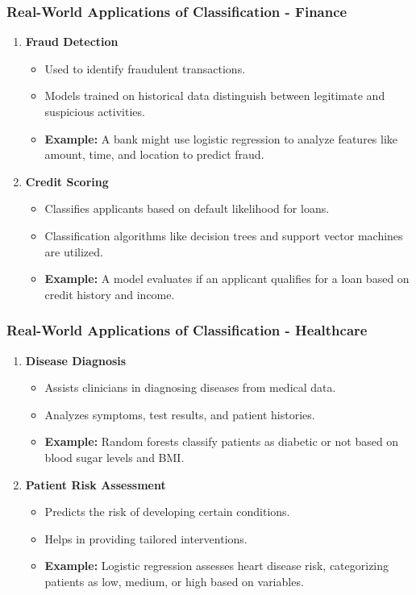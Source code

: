 \documentclass[aspectratio=169]{beamer}
\begin{document}
\begin{frame}[fragile]
    \frametitle{Real-World Applications of Classification - Finance}
    \begin{enumerate}
        \item \textbf{Fraud Detection}
            \begin{itemize}
                \item Used to identify fraudulent transactions.
                \item Models trained on historical data distinguish between legitimate and suspicious activities.
                \item \textbf{Example:} A bank might use logistic regression to analyze features like amount, time, and location to predict fraud.
            \end{itemize}
            
        \item \textbf{Credit Scoring}
            \begin{itemize}
                \item Classifies applicants based on default likelihood for loans.
                \item Classification algorithms like decision trees and support vector machines are utilized.
                \item \textbf{Example:} A model evaluates if an applicant qualifies for a loan based on credit history and income.
            \end{itemize}
    \end{enumerate}
\end{frame}

\begin{frame}[fragile]
    \frametitle{Real-World Applications of Classification - Healthcare}
    \begin{enumerate}
        \item \textbf{Disease Diagnosis}
            \begin{itemize}
                \item Assists clinicians in diagnosing diseases from medical data.
                \item Analyzes symptoms, test results, and patient histories.
                \item \textbf{Example:} Random forests classify patients as diabetic or not based on blood sugar levels and BMI.
            \end{itemize}

        \item \textbf{Patient Risk Assessment}
            \begin{itemize}
                \item Predicts the risk of developing certain conditions.
                \item Helps in providing tailored interventions.
                \item \textbf{Example:} Logistic regression assesses heart disease risk, categorizing patients as low, medium, or high based on variables.
            \end{itemize}
    \end{enumerate}
\end{frame}
\end{document}
